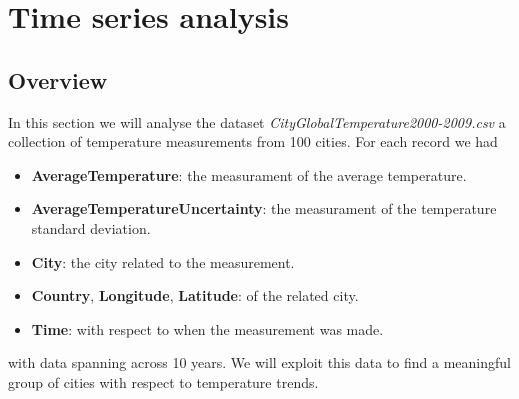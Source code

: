 \section{Time series analysis}

\subsection{Overview}
In this section we will analyse the dataset \textit{CityGlobalTemperature2000-2009.csv} a collection of temperature measurements from 100 cities. For each record we had
\begin{itemize}
    \item \textbf{AverageTemperature}: the measurament of the average temperature.
    \item \textbf{AverageTemperatureUncertainty}: the measurament of the temperature standard deviation.
    \item \textbf{City}: the city related to the measurement.
    \item \textbf{Country}, \textbf{Longitude}, \textbf{Latitude}: of the related city.
    \item \textbf{Time}: with respect to when the measurement was made.
\end{itemize}
with data spanning across 10 years.
We will exploit this data to find a meaningful group of cities with respect to temperature trends.
